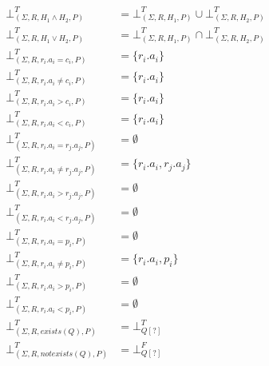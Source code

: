 \iffalse
\begin{mydef}
	\begin{align*}
		\bot^T_{(\Sigma,R,H_1 \land H_2,P)} & = \bot^T_{(\Sigma,R,H_1,P)} \cup \bot^T_{(\Sigma,R,H_2,P)} \\
		\bot^T_{(\Sigma,R,H_1 \lor H_2,P)} & = \bot^T_{(\Sigma,R,H_1,P)} \cap \bot^T_{(\Sigma,R,H_2,P)} \\
		\bot^T_{(\Sigma,R,r_i.a_i = c_i,P)} & = \{r_i.a_i\} \\
		\bot^T_{(\Sigma,R,r_i.a_i \neq c_i,P)} & = \{r_i.a_i\} \\
		\bot^T_{(\Sigma,R,r_i.a_i > c_i,P)} & = \{r_i.a_i\} \\
		\bot^T_{(\Sigma,R,r_i.a_i < c_i,P)} & = \{r_i.a_i\} \\
		\bot^T_{(\Sigma,R,r_i.a_i = r_j.a_j,P)} & = \emptyset \\
		\bot^T_{(\Sigma,R,r_i.a_i \neq r_j.a_j,P)} & = \{r_i.a_i,r_j.a_j\} \\
		\bot^T_{(\Sigma,R,r_i.a_i > r_j.a_j,P)} & = \emptyset \\
		\bot^T_{(\Sigma,R,r_i.a_i < r_j.a_j,P)} & = \emptyset \\
		\bot^T_{(\Sigma,R,r_i.a_i = p_i,P)} & = \emptyset \\
		\bot^T_{(\Sigma,R,r_i.a_i \neq p_i,P)} & = \{r_i.a_i,p_i\} \\
		\bot^T_{(\Sigma,R,r_i.a_i > p_i,P)} & = \emptyset \\
		\bot^T_{(\Sigma,R,r_i.a_i < p_i,P)} & = \emptyset \\
		\bot^T_{(\Sigma,R,exists(Q),P)} & = \bot^T_{Q[?]} \\
		\bot^T_{(\Sigma,R,notexists(Q),P)} & = \bot^F_{Q[?]}\\
	\end{align*}
	

\end{mydef}
